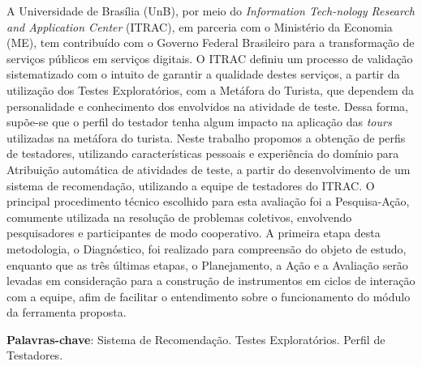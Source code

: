 \begin{resumo}

A Universidade de Brasília (UnB), por meio do \textit{Information Tech-nology Research and Application Center} (ITRAC), em parceria com o Ministério da Economia (ME), tem contribuído com o Governo Federal Brasileiro para a transformação de serviços públicos em serviços digitais. O ITRAC definiu um processo de validação sistematizado com o intuito de garantir a qualidade destes serviços, a partir da utilização dos Testes Exploratórios, com a Metáfora do Turista, que dependem da personalidade e conhecimento dos envolvidos na atividade de teste. Dessa forma, supõe-se que o perfil do testador tenha algum impacto na aplicação das \textit{tours} utilizadas na metáfora do turista. Neste trabalho propomos a obtenção de perfis de testadores, utilizando características pessoais e experiência do domínio para Atribuição automática de atividades de teste, a partir do desenvolvimento de um sistema de recomendação, utilizando a equipe de testadores do ITRAC. O principal procedimento técnico escolhido para esta avaliação foi a Pesquisa-Ação, comumente utilizada na resolução de problemas coletivos, envolvendo pesquisadores e participantes de modo cooperativo. A primeira etapa desta metodologia, o Diagnóstico, foi realizado para compreensão do objeto de estudo, enquanto que as três últimas etapas, o Planejamento, a Ação e a Avaliação serão levadas em consideração para a construção de instrumentos em ciclos de interação com a equipe, afim de facilitar o entendimento sobre o funcionamento do módulo da ferramenta proposta.

 \vspace{\onelineskip}

 \noindent
 \textbf{Palavras-chave}: Sistema de Recomendação. Testes Exploratórios. Perfil de Testadores.
\end{resumo}
